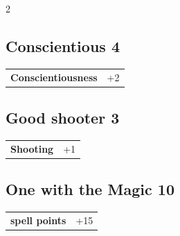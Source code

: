 \begin{multicols}{2}
\begin{tcolorbox}

\end{tcolorbox}

\begin{tcolorbox}
    \subsection*{Conscientious \hfill \small{4 }}
    \tcblower




\begin{tabular}{@{}ll@{}}
    \textbf{Conscientiousness} & +2\\
\end{tabular}


\end{tcolorbox}

\begin{tcolorbox}
    \subsection*{Good shooter \hfill \small{3 }}
    \tcblower




\begin{tabular}{@{}ll@{}}
    \textbf{Shooting} & +1\\
\end{tabular}


\end{tcolorbox}

\begin{tcolorbox}
    \subsection*{One with the Magic \hfill \small{10 }}
    \tcblower




\begin{tabular}{@{}ll@{}}
    \textbf{spell points} & +15\\
\end{tabular}


\end{tcolorbox}
\end{multicols}
